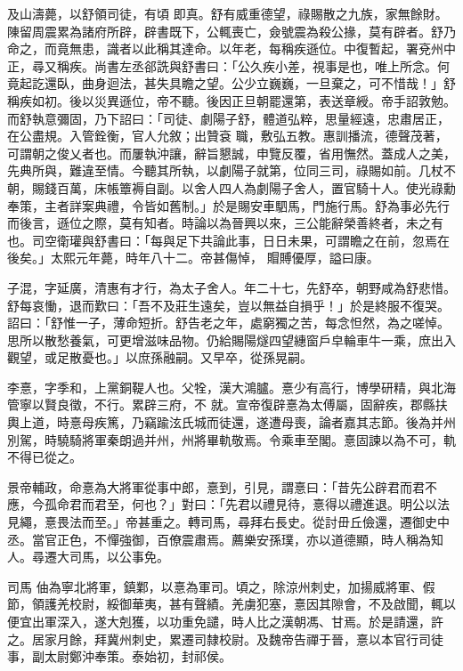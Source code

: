 \begin{pinyinscope}
 及山濤薨，以舒領司徒，有頃
 即真。舒有威重德望，祿賜散之九族，家無餘財。陳留周震累為諸府所辟，辟書既下，公輒喪亡，僉號震為殺公掾，莫有辟者。舒乃命之，而竟無患，識者以此稱其達命。以年老，每稱疾遜位。中復暫起，署兗州中正，尋又稱疾。尚書左丞郤詵與舒書曰：「公久疾小差，視事是也，唯上所念。何竟起訖還臥，曲身迴法，甚失具瞻之望。公少立巍巍，一旦棄之，可不惜哉！」舒稱疾如初。後以災異遜位，帝不聽。後因正旦朝罷還第，表送章綬。帝手詔敦勉。而舒執意彌固，乃下詔曰：「司徒、劇陽子舒，體道弘粹，思量經遠，忠肅居正，在公盡規。入管銓衡，官人允敘；出贊袞
 職，敷弘五教。惠訓播流，德聲茂著，可謂朝之俊乂者也。而屢執沖讓，辭旨懇誠，申覽反覆，省用憮然。蓋成人之美，先典所與，難違至情。今聽其所執，以劇陽子就第，位同三司，祿賜如前。几杖不朝，賜錢百萬，床帳簟褥自副。以舍人四人為劇陽子舍人，置官騎十人。使光祿勳奉策，主者詳案典禮，令皆如舊制。」於是賜安車駟馬，門施行馬。舒為事必先行而後言，遜位之際，莫有知者。時論以為晉興以來，三公能辭榮善終者，未之有也。司空衛瓘與舒書曰：「每與足下共論此事，日日未果，可謂瞻之在前，忽焉在後矣。」太熙元年薨，時年八十二。帝甚傷悼，
 賵賻優厚，謚曰康。



 子混，字延廣，清惠有才行，為太子舍人。年二十七，先舒卒，朝野咸為舒悲惜。舒每哀慟，退而歎曰：「吾不及莊生遠矣，豈以無益自損乎！」於是終服不復哭。詔曰：「舒惟一子，薄命短折。舒告老之年，處窮獨之苦，每念怛然，為之嗟悼。思所以散愁養氣，可更增滋味品物。仍給賜陽燧四望繐窗戶皁輪車牛一乘，庶出入觀望，或足散憂也。」以庶孫融嗣。又早卒，從孫晃嗣。



 李憙，字季和，上黨銅鞮人也。父牷，漢大鴻臚。憙少有高行，博學研精，與北海管寧以賢良徵，不行。累辟三府，不
 就。宣帝復辟憙為太傅屬，固辭疾，郡縣扶輿上道，時憙母疾篤，乃竊踰泫氏城而徒還，遂遭母喪，論者嘉其志節。後為并州別駕，時驍騎將軍秦朗過并州，州將畢軌敬焉。令乘車至閣。憙固諫以為不可，軌不得已從之。



 景帝輔政，命憙為大將軍從事中郎，憙到，引見，謂憙曰：「昔先公辟君而君不應，今孤命君而君至，何也？」對曰：「先君以禮見待，憙得以禮進退。明公以法見繩，憙畏法而至。」帝甚重之。轉司馬，尋拜右長史。從討毌丘儉還，遷御史中丞。當官正色，不憚強御，百僚震肅焉。薦樂安孫璞，亦以道德顯，時人稱為知人。尋遷大司馬，以公事免。



 司馬
 伷為寧北將軍，鎮鄴，以憙為軍司。頃之，除涼州刺史，加揚威將軍、假節，領護羌校尉，綏御華夷，甚有聲績。羌虜犯塞，憙因其隙會，不及啟聞，輒以便宜出軍深入，遂大剋獲，以功重免譴，時人比之漢朝馮、甘焉。於是請還，許之。居家月餘，拜冀州刺史，累遷司隸校尉。及魏帝告禪于晉，憙以本官行司徒事，副太尉鄭沖奉策。泰始初，封祁侯。




\end{pinyinscope}
